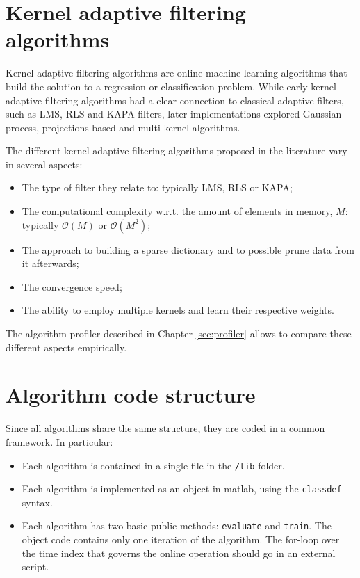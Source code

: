 \documentclass[]{report}
\begin{document}

\section{Kernel adaptive filtering algorithms}

Kernel adaptive filtering algorithms are online machine learning algorithms that build the solution to a regression or classification problem. While early kernel adaptive filtering algorithms had a clear connection to classical adaptive filters, such as LMS, RLS and KAPA filters, later implementations explored Gaussian process, projections-based and multi-kernel algorithms.

The different kernel adaptive filtering algorithms proposed in the literature vary in several aspects:
\begin{itemize}
\item The type of filter they relate to: typically LMS, RLS or KAPA;
\item The computational complexity w.r.t. the amount of elements in memory, $M$: typically $\mathcal{O}(M)$ or $\mathcal{O}(M^2)$;
\item The approach to building a sparse dictionary and to possible prune data from it afterwards;
\item The convergence speed;
\item The ability to employ multiple kernels and learn their respective weights.
\end{itemize}
The algorithm profiler described in Chapter \ref{sec:profiler} allows to compare these different aspects empirically.

\section{Algorithm code structure}

Since all algorithms share the same structure, they are coded in a common framework. In particular:
\begin{itemize}
\item Each algorithm is contained in a single file in the \verb"/lib" folder.
\item Each algorithm is implemented as an object in matlab, using the \verb"classdef" syntax.
\item Each algorithm has two basic public methods: \verb"evaluate" and \verb"train".
The object code contains only one iteration of the algorithm. The for-loop over the time index that governs the online operation should go in an external script.
\end{itemize}
\end{document}
